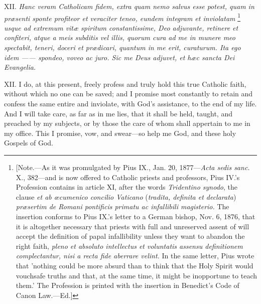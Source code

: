 XII. \emph{Hanc veram Catholicam fidem, extra quam nemo salvus esse potest, quam in præsenti sponte profiteor et veraciter teneo, eundem integram et inviolatam} \footnote{\par{} [Note.—As it was promulgated by Pius IX., Jan. 20, 1877—\emph{Acta sedis sanc.} X., 382—and is now offered to Catholic priests and professors, Pius IV.'s Profession contains in article XI, after the words \emph{Tridentino synodo}, the clause \emph{et ab œcumenico concilio Vaticano} (\emph{tradita, definita et declarata}) \emph{præsertim de Romani pontificis primatu ac infallibili magisterio.} The insertion conforms to Pius IX.'s letter to a German bishop, Nov. 6, 1876, that it is altogether necessary that priests with full and unreserved assent of will accept the definition of papal infallibility unless they want to abandon the right faith,  \emph{pleno et absoluto intellectus et voluntatis assensu definitionem complectantur, nisi a recta fide aberrare velint.}  In the same letter, Pius wrote that 'nothing could be more absurd than to think that the Holy Spirit would vouchsafe truths and that, at the same time, it might be inopportune to teach them.' The Profession is printed with the insertion in Benedict's Code of Canon Law.—Ed.]}  \emph{usque ad extremum vitæ spiritum constantissime, Deo adjuvante, retinere et confiteri, atque a meis subditis vel illis, quorum cura ad me in munere meo spectabit, teneri, doceri et prædicari, quantum in me erit, curaturum. Ita ego idem —— spondeo, voveo ac juro. Sic me Deus adjuvet, et hæc sancta Dei Evangelia.}

XII. I do, at this present, freely profess and truly hold this true Catholic faith, without which no one can be saved; and I promise most constantly to retain and confess the same entire and inviolate, with God's assistance, to the end of my life. And I will take care, as far as in me lies, that it shall be held, taught, and preached by my subjects, or by those the care of whom shall appertain to me in my office. This I promise, vow, and swear—so help me God, and these holy Gospels of God.
